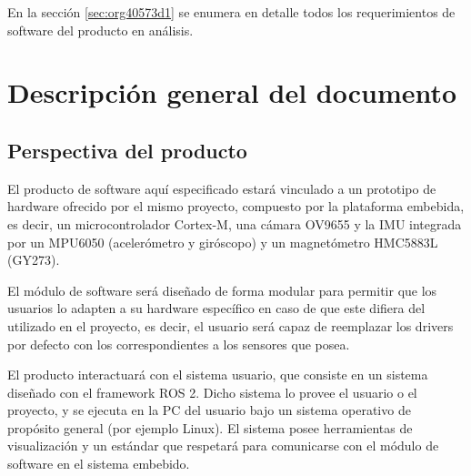 \documentclass[12pt,a4paper, twosite]{article}
\begin{document}
En la sección \ref{sec:org40573d1} se enumera en detalle todos los requerimientos de software
del producto en análisis.

\section{Descripción general del documento}
\label{sec:orgc1c4017}




\subsection{Perspectiva del producto}
\label{sec:org24980a8}


El producto de software aquí especificado estará vinculado a un prototipo de hardware
ofrecido por el mismo proyecto, compuesto por la plataforma embebida, es decir,
un microcontrolador Cortex-M, una cámara OV9655 y la IMU integrada por un MPU6050 (acelerómetro
y giróscopo) y un magnetómetro HMC5883L (GY273).

El módulo de software será diseñado de forma modular para permitir que los usuarios lo
adapten a su hardware específico en caso de que este difiera del utilizado en el proyecto, es decir, el usuario será capaz de reemplazar los drivers por defecto con los correspondientes a
los sensores que posea.

El producto interactuará con el sistema usuario, que consiste en un sistema diseñado con el
framework ROS 2. Dicho sistema lo provee el usuario o el proyecto, y se ejecuta en la PC del
usuario bajo un sistema operativo de propósito general (por ejemplo Linux). El sistema posee
herramientas de visualización y un estándar que respetará para comunicarse con el módulo de 
software en el sistema embebido.
\end{document}
